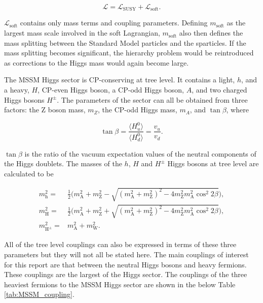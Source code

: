 \begin{equation}
    \mathcal{L} = \mathcal{L}_{\text{SUSY}} + \mathcal{L}_{\text{soft}}.
\end{equation}

\(\mathcal{L}_{\text{soft}}\) contains only mass terms and coupling parameters. Defining \(m_{\text{soft}}\) as the largest mass scale involved in the soft Lagrangian, \(m_{\text{soft}}\) also then defines the mass splitting between the Standard Model particles and the sparticles. If the mass splitting becomes significant, the hierarchy problem would be reintroduced as corrections to the Higgs mass would again become large.

The MSSM Higgs sector is CP-conserving at tree level. It contains a light, \(h\), and a heavy, \(H\), CP-even Higgs boson, a CP-odd Higgs boson, \(A\), and two charged Higgs bosons \(H^{\pm}\). The parameters of the sector can all be obtained from three factors: the Z boson mass, \(m_Z\), the CP-odd Higgs mass, \(m_A\), and \(\tan\beta\), where

\begin{equation}
    \tan \beta = \frac{\langle H_{u}^{0} \rangle}{\langle H_{d}^{0} \rangle} = \frac{v_u}{v_d}.
\end{equation}

\(\tan \beta\) is the ratio of the vacuum expectation values of the neutral components of the Higgs doublets. The masses of the \(h\), \(H\) and \(H^{\pm}\) Higgs bosons at tree level are calculated to be \cite{mssm_theory}

\begin{subequations}
\begin{align}
    m_{\text{h}}^2 = & \frac{1}{2}\Big(m_{\text{A}}^2 + m_{\text{Z}}^2 - \sqrt{(m_{\text{A}}^2 + m_{\text{Z}}^2)^2 - 4 m_{\text{Z}}^2 m_{\text{A}}^2 \cos^2{2\beta}} \Big), \\
    m_{\text{H}}^2 = & \frac{1}{2}\Big(m_{\text{A}}^2 + m_{\text{Z}}^2 + \sqrt{(m_{\text{A}}^2 + m_{\text{Z}}^2)^2 - 4 m_{\text{Z}}^2 m_{\text{A}}^2 \cos^2{2\beta}} \Big), \\
    m_{\text{H}^{\pm}}^2 = & m_{\text{A}}^2 + m_{\text{W}}^2.
\end{align}
\end{subequations}

All of the tree level couplings can also be expressed in terms of these three parameters but they will not all be stated here. The main couplings of interest for this report are that between the neutral Higgs bosons and heavy fermions. These couplings are the largest of the Higgs sector. The couplings of the three heaviest fermions to the MSSM Higgs sector are shown in the below Table \ref{tab:MSSM_coupling}. \\

